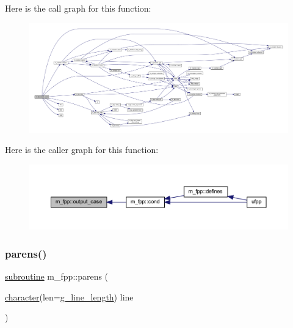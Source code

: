Here is the call graph for this function\+:
\nopagebreak
\begin{figure}[H]
\begin{center}
\leavevmode
\includegraphics[width=350pt]{namespacem__fpp_aeab3b5145d977b953ea972b2882e442a_cgraph}
\end{center}
\end{figure}
Here is the caller graph for this function\+:
\nopagebreak
\begin{figure}[H]
\begin{center}
\leavevmode
\includegraphics[width=350pt]{namespacem__fpp_aeab3b5145d977b953ea972b2882e442a_icgraph}
\end{center}
\end{figure}
\mbox{\label{namespacem__fpp_a4b9be76f637b58b358ee2a9ec95db933}} 
\subsubsection{\texorpdfstring{parens()}{parens()}}
{\footnotesize\ttfamily \hyperlink{M__stopwatch_83_8txt_acfbcff50169d691ff02d4a123ed70482}{subroutine} m\+\_\+fpp\+::parens (\begin{DoxyParamCaption}\item[{\hyperlink{option__stopwatch_83_8txt_abd4b21fbbd175834027b5224bfe97e66}{character}(len=\hyperlink{namespacem__fpp_ab93f8756cf248cf8db932573009d4664}{g\+\_\+line\+\_\+length})}]{line }\end{DoxyParamCaption})}



